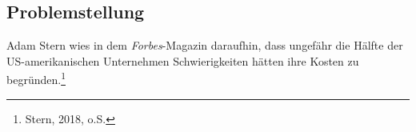 \begin{comment} GELÖSCHT, WEIL DIESE EINE BEHAUPTUNG IST (25.10.2021)
    \\\\
    Für viele Unternehmen ist eine große Herausforderung, die Kosten von Cloud-Diensten übersichtlich zu halten und Optimierungsmöglichkeit leicht zu erkennen. Zusätzlich besteht die Gefahr, unangenehme Überraschungen in einer Rechnung zu bekommen, weil keine Grenze für den Konsum von Cloud-Diensten festgelegt wurde. 
    \end{comment}
\subsection{Problemstellung}
\begin{comment}
\\\\
”Heute hatten wir 17 Gäste für unsere derzeit 20 Zimmer. Für die kommende Messe am Wochenende sind wir bereit 500 Gäste zu empfangen. Nach der Messe werden wir mit unseren üblichen 20 Zimmern wie immer gut arbeiten können.”
Normalerweise bräuchte man eine große Investition zu machen, um solche kurzfristige Nachfrage zu erfüllen. Vergleichbar ist es bei traditionellen IT-Infrastrukturen, mehr Kapazitätsbedarf, würde die Anschaffung von einer neuen Hardware bedeuten.
\\\\
\end{comment}
Adam Stern wies in dem \textit{Forbes}-Magazin daraufhin, dass ungefähr die Hälfte der US-amerikanischen Unternehmen Schwierigkeiten hätten ihre Kosten zu begründen.\footnote{Stern, 2018, o.S.}\\ 
